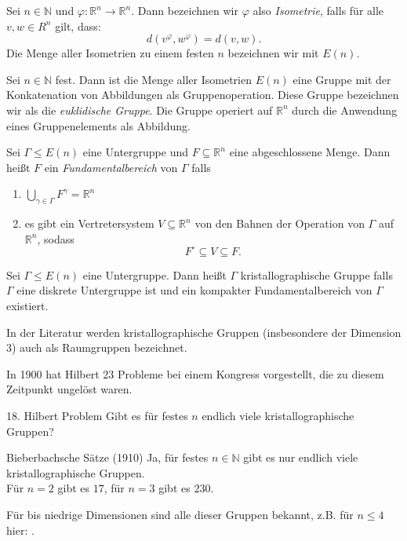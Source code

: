 \documentclass{beamer}
\theoremstyle{plain}
\newcommand\R{\mathbb R}
\newcommand\N{\mathbb N}
\renewcommand{\phi}{\varphi}
\begin{document}
\begin{frame}
    \begin{definition}
        Sei $n \in \N$ und $\phi: \R^n \to \R^n$. Dann bezeichnen wir $\phi$ also \emph{Isometrie}, falls für alle $v, w \in R^n$ gilt, dass:
        $$
            d(v^\phi, w^\phi) = d(v, w).
        $$\pause
        Die Menge aller Isometrien zu einem festen $n$ bezeichnen wir mit $E(n)$.
    \end{definition}
    \pause
    \begin{proposition}
        Sei $n \in \N$ fest. Dann ist die Menge aller Isometrien $E(n)$ eine Gruppe mit der Konkatenation von Abbildungen als Gruppenoperation.
        Diese Gruppe bezeichnen wir als die \emph{euklidische Gruppe}. Die Gruppe operiert auf $\R^n$ durch die Anwendung eines Gruppenelements als Abbildung.
    \end{proposition}
\end{frame}
\begin{frame}
    \begin{definition}
        Sei $\Gamma \leq E(n)$ eine Untergruppe und $F \subseteq \R^n$ eine abgeschlossene Menge. Dann heißt $F$ ein \emph{Fundamentalbereich} von $\Gamma$ falls
        \begin{enumerate}[label=(\roman*)]
            \item $\bigcup_{\gamma \in \Gamma} F^\gamma = \R^n$\pause
            \item es gibt ein Vertretersystem $V \subseteq \R^n$ von den Bahnen der Operation von $\Gamma$ auf $\R^n$, sodass
                $$
                    F^\circ \subseteq V \subseteq F.
                $$
        \end{enumerate}
    \end{definition}

    \pause
    \begin{definition}
        Sei $\Gamma \leq E(n)$ eine Untergruppe. Dann heißt $\Gamma$ kristallographische Gruppe falls $\Gamma$ eine diskrete Untergruppe ist und ein kompakter Fundamentalbereich von $\Gamma$ existiert.
    \end{definition}
    In der Literatur werden kristallographische Gruppen (insbesondere der Dimension $3$) auch als Raumgruppen bezeichnet.
\end{frame}

\begin{frame}
    In 1900 hat Hilbert 23 Probleme bei einem Kongress vorgestellt, die zu diesem Zeitpunkt ungelöst waren.
    \begin{block}{18. Hilbert Problem}
        Gibt es für festes $n$ endlich viele kristallographische Gruppen?
    \end{block}
    \pause
    \begin{exampleblock}{Bieberbachsche Sätze (1910)}
        Ja, für festes $n \in \N$ gibt es nur endlich viele kristallographische Gruppen. \\
        Für $n=2$ gibt es $17$, für $n=3$ gibt es $230$.
    \end{exampleblock}
    Für bis niedrige Dimensionen sind alle dieser Gruppen bekannt, z.B. für $n\leq 4$ hier: \cite{crystGrpsDimFour}.
\end{frame}
\end{document}
